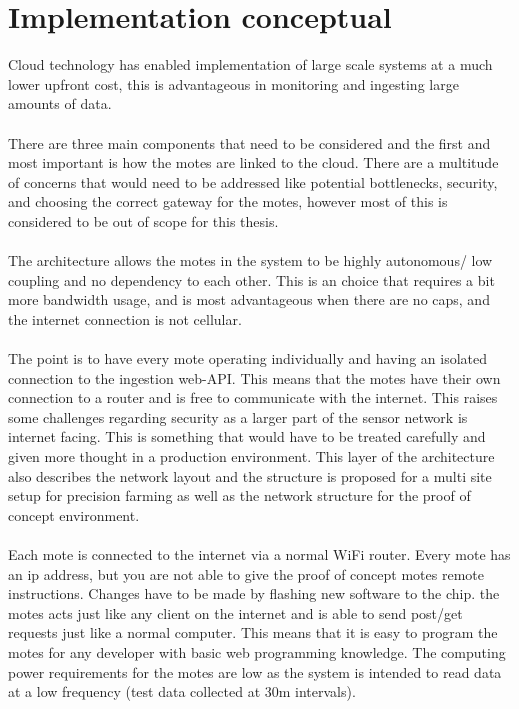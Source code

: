 \documentclass[]{uiophd}
\begin{document}
\section{Implementation conceptual}
Cloud technology has enabled implementation of large scale systems at a much lower upfront cost, this is advantageous in monitoring and ingesting large amounts of data.
\\\\
There are three main components that need to be considered and the first and most important is how the motes are linked to the cloud. There are a multitude of concerns that would need to be addressed like potential bottlenecks, security, and choosing the correct gateway for the motes, however most of this is considered to be out of scope for this thesis.
\\\\
The architecture allows the motes in the system to be highly autonomous/ low coupling and no dependency to each other. This is an choice that requires a bit more bandwidth usage, and is most advantageous when there are no caps, and the internet connection is not cellular.
\\\\
The point is to have every mote operating individually and having an isolated connection to the ingestion web-API. This means that the motes have their own connection to a router and is free to communicate with the internet. This raises some challenges regarding security as a larger part of the sensor network is internet facing. This is something that would have to be treated carefully and given more thought in a production environment. This layer of the architecture also describes the network layout and the structure is proposed for a multi site setup for precision farming as well as the network structure for the proof of concept environment.
\\\\
Each mote is connected to the internet via a normal WiFi router. Every mote has an ip address, but you are not able to give the proof of concept motes remote instructions. Changes have to be made by flashing new software to the chip. the motes acts just like any client on the internet and is able to send post/get requests just like a normal computer. This means that it is easy to program the motes for any developer with basic web programming knowledge. The computing power requirements for the motes are low as the system is intended to read data at a low frequency (test data collected at 30m intervals).
\\\\
\end{document}
